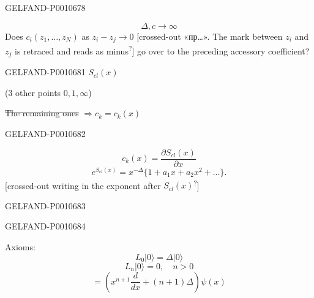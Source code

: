 \begin{GelfandAdjacentEvidence}{GELFAND-P001067}{8}

\begin{equation*}
\Delta,c\to\infty
\end{equation*}
Does $c_i(z_1,\ldots,z_N)$ as $z_i-z_j\to0$ [crossed-out «пр…». The mark between \(z_i\) and \(z_j\) is retraced and reads as minus\textsuperscript{?}] go over to the preceding accessory coefficient?
\end{GelfandAdjacentEvidence}



\begin{GelfandAdjacentEvidence}{GELFAND-P001068}{1}
$S_{cl}(x)$

(3 other points $0,1,\infty$)

\sout{The remaining ones} $\Rightarrow c_k=c_k(x)$
\end{GelfandAdjacentEvidence}
\begin{GelfandAdjacentEvidence}{GELFAND-P001068}{2}

\begin{equation*}
c_k(x)=\frac{\partial S_{cl}(x)}{\partial x}
\end{equation*}
\begin{equation*}
e^{S_{cl}(x)}=x^{-\Delta}\{1+a_1x+a_2x^2+\ldots\}.
\end{equation*}
[crossed-out writing in the exponent after \(S_{cl}(x)\)\textsuperscript{?}]
\end{GelfandAdjacentEvidence}
\begin{GelfandAdjacentEvidence}{GELFAND-P001068}{3}

\end{GelfandAdjacentEvidence}
\begin{GelfandAdjacentEvidence}{GELFAND-P001068}{4}


Axioms:
\begin{equation*}
L_0|0\rangle=\Delta|0\rangle
\end{equation*}
\begin{equation*}
L_n|0\rangle=0,\quad n>0
\end{equation*}
\begin{equation*}
[L_n,\psi(x)]=\left(x^{n+1}\frac{d}{dx}+(n+1)\Delta\right)\psi(x)
\end{equation*}
\end{GelfandAdjacentEvidence}
